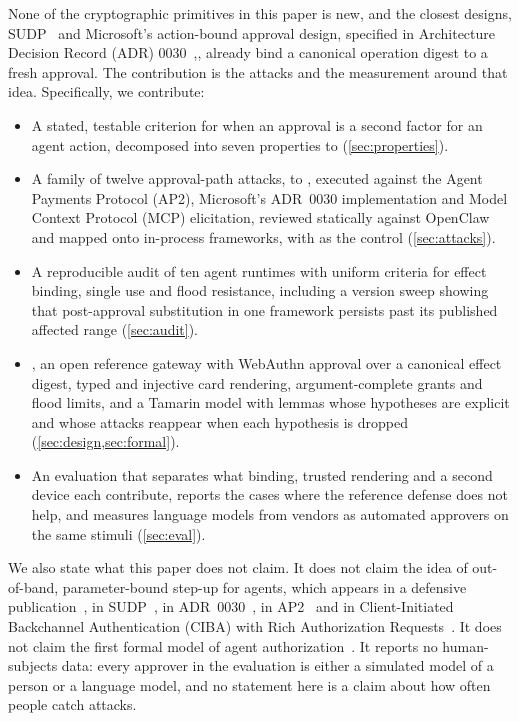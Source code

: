 None of the cryptographic primitives in this paper is new, and the closest designs, SUDP~\citep{yu2026sudp} and
Microsoft's action-bound approval design, specified in Architecture Decision Record (ADR)
0030~\citep{microsoft2026adr0030},, already bind a canonical operation digest
to a fresh approval. The contribution is the attacks and the measurement around that idea. Specifically, we contribute:
\begin{itemize}[leftmargin=1.4em,itemsep=2pt]
\item A stated, testable criterion for when an approval is a second factor for an agent action, decomposed into
  seven properties  to  (\cref{sec:properties}).
\item A family of twelve approval-path attacks,  to , executed against the Agent Payments Protocol (AP2), Microsoft's ADR~0030
  implementation and Model Context Protocol (MCP) elicitation, reviewed statically against OpenClaw and mapped
  onto in-process frameworks, with \sys{} as the control
  (\cref{sec:attacks}).
\item A reproducible audit of ten agent runtimes with uniform criteria for effect binding, single use and flood
  resistance, including a version sweep showing that post-approval substitution in one framework persists past
  its published affected range (\cref{sec:audit}).
\item \sys{}, an open reference gateway with WebAuthn approval over a canonical effect digest, typed and
  injective card rendering, argument-complete grants and flood limits, and a Tamarin model with
  \foLemmas{} lemmas whose hypotheses are explicit and whose attacks reappear when each hypothesis is dropped
  (\cref{sec:design,sec:formal}).
\item An evaluation that separates what binding, trusted rendering and a second device each contribute, reports
  the cases where the reference defense does not help, and measures \llmModels{} language models from
  \llmVendors{} vendors as automated approvers on the same stimuli (\cref{sec:eval}).
\end{itemize}

We also state what this paper does not claim. It does not claim the idea of out-of-band,
parameter-bound step-up for agents, which appears in a defensive publication~\citep{vyas2026visamfa}, in
SUDP~\citep{yu2026sudp}, in ADR~0030~\citep{microsoft2026adr0030}, in AP2~\citep{ap2spec} and in Client-Initiated Backchannel Authentication (CIBA) with Rich
Authorization Requests~\citep{ciba2021,rfc9396}. It does not claim the first formal model of agent
authorization~\citep{jiang2026payment,chen2026aith}. It reports no human-subjects data: every approver in the
evaluation is either a simulated model of a person or a language model, and no statement here is a claim about
how often people catch attacks.

